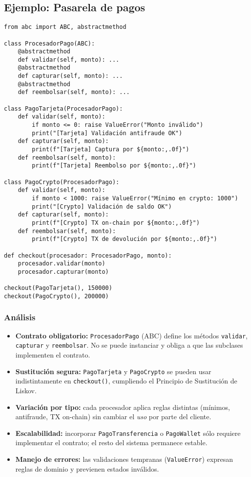 \documentclass[12pt,a4paper]{article}
\begin{document}
\subsection*{Ejemplo: Pasarela de pagos}
\begin{lstlisting}
from abc import ABC, abstractmethod

class ProcesadorPago(ABC):
    @abstractmethod
    def validar(self, monto): ...
    @abstractmethod
    def capturar(self, monto): ...
    @abstractmethod
    def reembolsar(self, monto): ...

class PagoTarjeta(ProcesadorPago):
    def validar(self, monto):
        if monto <= 0: raise ValueError("Monto inválido")
        print("[Tarjeta] Validación antifraude OK")
    def capturar(self, monto):
        print(f"[Tarjeta] Captura por ${monto:,.0f}")
    def reembolsar(self, monto):
        print(f"[Tarjeta] Reembolso por ${monto:,.0f}")

class PagoCrypto(ProcesadorPago):
    def validar(self, monto):
        if monto < 1000: raise ValueError("Mínimo en crypto: 1000")
        print("[Crypto] Validación de saldo OK")
    def capturar(self, monto):
        print(f"[Crypto] TX on-chain por ${monto:,.0f}")
    def reembolsar(self, monto):
        print(f"[Crypto] TX de devolución por ${monto:,.0f}")

def checkout(procesador: ProcesadorPago, monto):
    procesador.validar(monto)
    procesador.capturar(monto)

checkout(PagoTarjeta(), 150000)
checkout(PagoCrypto(), 200000)
\end{lstlisting}

\subsubsection*{Análisis}
\begin{itemize}
    \item \textbf{Contrato obligatorio:} \texttt{ProcesadorPago} (ABC) define los métodos \texttt{validar}, \texttt{capturar} y \texttt{reembolsar}. No se puede instanciar y obliga a que las subclases implementen el contrato.
    \item \textbf{Sustitución segura:} \texttt{PagoTarjeta} y \texttt{PagoCrypto} se pueden usar indistintamente en \texttt{checkout()}, cumpliendo el Principio de Sustitución de Liskov.
    \item \textbf{Variación por tipo:} cada procesador aplica reglas distintas (mínimos, antifraude, TX on-chain) sin cambiar el \emph{uso} por parte del cliente.
    \item \textbf{Escalabilidad:} incorporar \texttt{PagoTransferencia} o \texttt{PagoWallet} sólo requiere implementar el contrato; el resto del sistema permanece estable.
    \item \textbf{Manejo de errores:} las validaciones tempranas (\texttt{ValueError}) expresan reglas de dominio y previenen estados inválidos.
\end{itemize}
\end{document}
